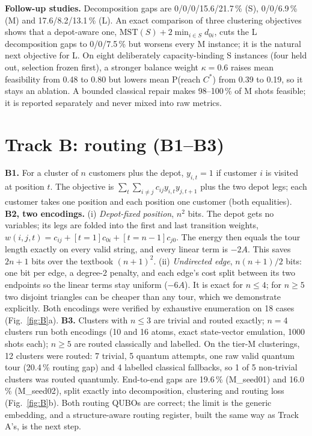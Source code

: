 \documentclass[9pt,twocolumn]{extarticle}
\begin{document}
\textbf{Follow-up studies.} Decomposition gaps are 0/0/0/15.6/21.7\,\% (S), 0/0/6.9\,\% (M) and 17.6/8.2/13.1\,\% (L). An exact comparison of three clustering objectives shows that a depot-aware one, $\mathrm{MST}(S)+2\min_{i\in S}d_{0i}$, cuts the L decomposition gaps to 0/0/7.5\,\% but worsens every M instance; it is the natural next objective for L. On eight deliberately capacity-binding S instances (four held out, selection frozen first), a stronger balance weight $\kappa=0.6$ raises mean feasibility from 0.48 to 0.80 but lowers mean P(reach $C^*$) from 0.39 to 0.19, so it stays an ablation. A bounded classical repair makes 98--100\,\% of M shots feasible; it is reported separately and never mixed into raw metrics.

\section{Track B: routing (B1--B3)}
\textbf{B1.} For a cluster of $n$ customers plus the depot, $y_{i,t}=1$ if customer $i$ is visited at position $t$. The objective is $\sum_t\sum_{i\ne j}c_{ij}y_{i,t}y_{j,t+1}$ plus the two depot legs; each customer takes one position and each position one customer (both equalities).
\textbf{B2, two encodings.} (i) \emph{Depot-fixed position}, $n^2$ bits. The depot gets no variables; its legs are folded into the first and last transition weights, $w(i,j,t)=c_{ij}+[t{=}1]c_{0i}+[t{=}n-1]c_{j0}$. The energy then equals the tour length exactly on every valid string, and every linear term is $-2A$. This saves $2n+1$ bits over the textbook $(n+1)^2$. (ii) \emph{Undirected edge}, $n(n+1)/2$ bits: one bit per edge, a degree-2 penalty, and each edge's cost split between its two endpoints so the linear terms stay uniform ($-6A$). It is exact for $n\le4$; for $n\ge5$ two disjoint triangles can be cheaper than any tour, which we demonstrate explicitly. Both encodings were verified by exhaustive enumeration on 18 cases (Fig.~\ref{fig:B}a).
\textbf{B3.} Clusters with $n\le3$ are trivial and routed exactly; $n=4$ clusters run both encodings (10 and 16 atoms, exact state-vector emulation, 1000 shots each); $n\ge5$ are routed classically and labelled. On the tier-M clusterings, 12 clusters were routed: 7 trivial, 5 quantum attempts, one raw valid quantum tour (20.4\,\% routing gap) and 4 labelled classical fallbacks, so 1 of 5 non-trivial clusters was routed quantumly. End-to-end gaps are 19.6\,\% (M\_seed01) and 16.0\,\% (M\_seed02), split exactly into decomposition, clustering and routing loss (Fig.~\ref{fig:B}b). Both routing QUBOs are correct; the limit is the generic embedding, and a structure-aware routing register, built the same way as Track A's, is the next step.
\end{document}
